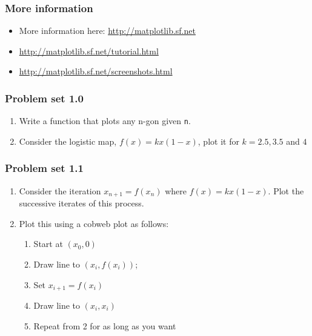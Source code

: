 \documentclass[14pt,compress]{beamer}
\newcounter{time}
\newcommand{\inctime}[1]{\addtocounter{time}{#1}{\tiny \thetime\ m}}
\newcommand{\typ}[1]{\texttt{#1}}
\begin{document}
\begin{frame}
  \frametitle{More information}
  \begin{itemize}
  \item More information here: \url{http://matplotlib.sf.net}
  \item \url{http://matplotlib.sf.net/tutorial.html}
  \item \url{http://matplotlib.sf.net/screenshots.html}
  \end{itemize}

  \inctime{25}
\end{frame}

\begin{frame}
  \frametitle{Problem set 1.0}
  \begin{enumerate}
      \item Write a function that plots any n-gon given \typ{n}.
      \item Consider the logistic map, $f(x) = kx(1-x)$, plot it for
          $k=2.5, 3.5$ and $4$
\end{enumerate}
\end{frame}

\begin{frame}
  \frametitle{Problem set 1.1}
  \begin{enumerate}
      \item Consider the iteration $x_{n+1} = f(x_n)$ where $f(x) =
          kx(1-x)$.  Plot the successive iterates of this process.
      \item Plot this using a cobweb plot as follows:
          \begin{enumerate}
              \item Start at $(x_0, 0)$
              \item Draw line to $(x_i, f(x_i))$; 
              \item Set $x_{i+1} = f(x_i)$
              \item Draw line to $(x_i, x_i)$
              \item Repeat from 2 for as long as you want 
          \end{enumerate}
    \end{enumerate}
\end{frame}
\end{document}
